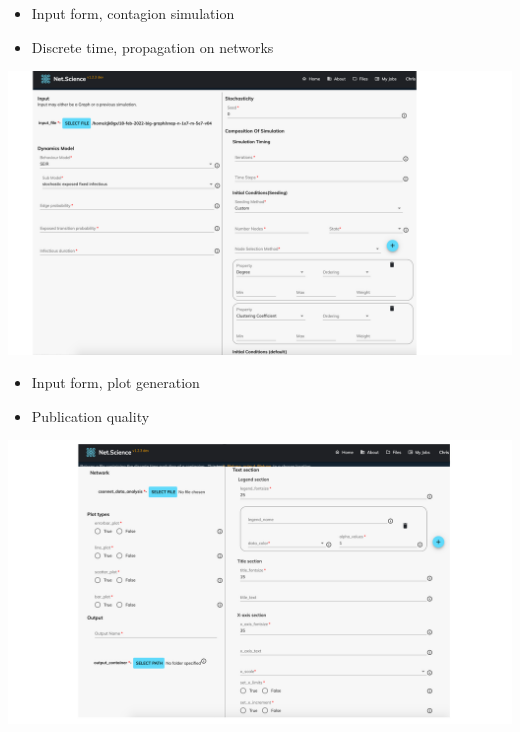 \documentclass[landscape,paperwidth=70in,paperheight=46in,fontscale=0.225]{baposter} %
\begin{document}
\begin{poster}
{\begin{minipage}{.29\textwidth}
\begin{itemize}[leftmargin=*,noitemsep,topsep=0pt]
\item Input form, contagion simulation
\item Discrete time, propagation on networks
\end{itemize}
\end{minipage}
\hfill
\begin{minipage}{.71\textwidth}         
\includegraphics[scale=0.25]{figures/csonnet-model-seeds.pdf} 
\end{minipage}

\vspace{0.3in}

\begin{minipage}{.29\textwidth}
\begin{itemize}[leftmargin=*,noitemsep,topsep=0pt]
\item Input form, plot generation
\item Publication quality
\end{itemize}
\end{minipage}
\hfill
\begin{minipage}{.71\textwidth}  
\vspace{5mm}
\includegraphics[scale=0.26]{figures/plot_input.pdf}
\end{minipage}
\hfill
\vspace{5mm}

}
\end{poster}
\end{document}
